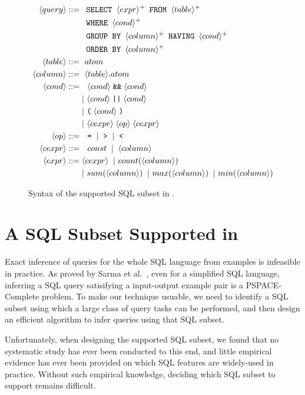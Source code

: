 \begin{figure}[t]
\footnotesize%
\begin{align*}
\langle query\rangle ::= {} 
	& \texttt{ SELECT } \langle expr\rangle^+ \texttt{ FROM } \langle table\rangle^+ \\
        & \texttt{ WHERE } \langle cond\rangle^+ \\ 
	&  \texttt{ GROUP BY } \langle column\rangle^+ \texttt{ HAVING } \langle cond\rangle^+\\
	&  \texttt{ ORDER BY } \langle column\rangle^+ \\
\langle table\rangle::= {} &\ atom \\
\langle column\rangle ::= {} &\ \langle table\rangle.atom\\
\langle cond\rangle ::= {} &\ \ \langle cond\rangle \;\texttt{\&\&}\; \langle cond\rangle \\ 
    & |\ \langle cond\rangle \;\texttt{||}\; \langle cond\rangle \\
    & |\ \texttt{(}\;\langle cond\rangle\;\texttt{)} \\
    & |\ \langle cexpr\rangle \;\langle op\rangle\; \langle cexpr\rangle \\
\langle op\rangle ::= {} &\ \ \texttt{=} \;\;|\;\; \texttt{>}  \;\;|\;\; \texttt{<}\\
\langle cexpr\rangle ::= {} &\ \ const \;\;|\;\; \langle column\rangle  \;\; \\
\langle expr\rangle ::= {} & \langle cexpr\rangle \;\;|\ count(\langle column\rangle) \\
    & |\ sum(\langle column\rangle) \;\;|\ max(\langle column\rangle) \;\;|\ min(\langle column\rangle) 
\end{align*}
\normalsize%
\caption{Syntax of the supported SQL subset in \ourtool.
}
\label{fig:syntax}
\end{figure}


\section{A SQL Subset Supported in \ourtool}
\label{sec:langsubset}

Exact inference of queries for the whole
SQL language from examples
is infeasible in practice. As proved
by Sarma et al.~\cite{DasSarma:2010}, even for
a simplified SQL language, inferring
a SQL query satisifying a input-output example
pair is a PSPACE-Complete problem. To make our
technique usuable, we need to identify a
SQL subset using which a large class of query tasks
can be performed, and then design an efficient
algorithm to infer queries using that SQL subset.

Unfortunately, when designing the supported SQL
subset, we found that no systematic
study has ever been conducted to this end,
and little empirical evidence has ever been provided
on which SQL features are widely-used in practice.
Without such empirical knowledge, deciding which
SQL subset to support remains difficult.

